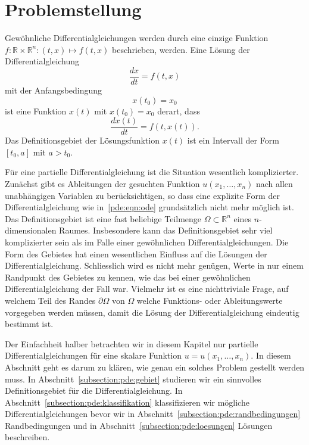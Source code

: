 %
%
%
\section{Problemstellung
\label{section:pde:problem}}
%
%
Gewöhnliche Differentialgleichungen werden durch eine einzige Funktion
$f\colon \mathbb R\times\mathbb R^n: (t,x)\mapsto f(t,x)$ beschrieben,
werden.
Eine Lösung der Differentialgleichung
\begin{equation}
\frac{dx}{dt} = f(t,x)
\label{pde:eqn:ode}
\end{equation}
mit der Anfangsbedingung
\[
x(t_0) = x_0
\]
ist eine Funktion $x(t)$ mit $x(t_0)=x_0$ derart, dass 
\[
\frac{dx(t)}{dt} = f(t, x(t)).
\]
Das Definitionsgebiet der Lösungsfunktion $x(t)$ ist ein Intervall
der Form $[t_0,a]$ mit $a>t_0$.
%

Für eine partielle Differentialgleichung ist die Situation wesentlich
komplizierter.
Zunächst gibt es Ableitungen der gesuchten Funktion $u(x_1,\dots,x_n)$
nach allen unabhängigen Variablen zu
berücksichtigen, so dass eine explizite Form der Differentialgleichung
wie in~\eqref{pde:eqn:ode} grundsätzlich nicht mehr möglich ist.
Das Definitionsgebiet ist eine fast beliebige Teilmenge
$\Omega\subset\mathbb R^n$ eines $n$-dimensionalen Raumes.
Insbesondere kann das Definitionsgebiet sehr viel komplizierter sein
als im Falle einer gewöhnlichen Differentialgleichungen.
Die Form des Gebietes hat einen wesentlichen Einfluss auf die Lösungen
der Differentialgleichung.
Schliesslich wird es nicht mehr genügen, Werte in nur einem Randpunkt
des Gebietes zu kennen, wie das bei einer gewöhnlichen Differentialgleichung
der Fall war.
Vielmehr ist es eine nichttriviale Frage, auf welchem Teil des Randes
$\partial\Omega$ von $\Omega$ welche Funktions- oder Ableitungswerte
vorgegeben werden müssen, damit die Lösung der Differentialgleichung
eindeutig bestimmt ist.

Der Einfachheit halber betrachten wir in diesem Kapitel nur partielle
Differentialgleichungen für eine skalare Funktion $u=u(x_1,\dots,x_n)$.
In diesem Abschnitt geht es darum zu klären, wie genau ein solches
Problem gestellt werden muss.
In Abschnitt~\ref{subsection:pde:gebiet} studieren wir ein sinnvolles
Definitionsgebiet für die Differentialgleichung.
In Abschnitt~\ref{subsection:pde:klassifikation} klassifizieren wir
mögliche Differentialgleichungen bevor wir in
Abschnitt~\ref{subsection:pde:randbedingungen} Randbedingungen und
in Abschnitt~\ref{subsection:pde:loesungen} Lösungen beschreiben.

